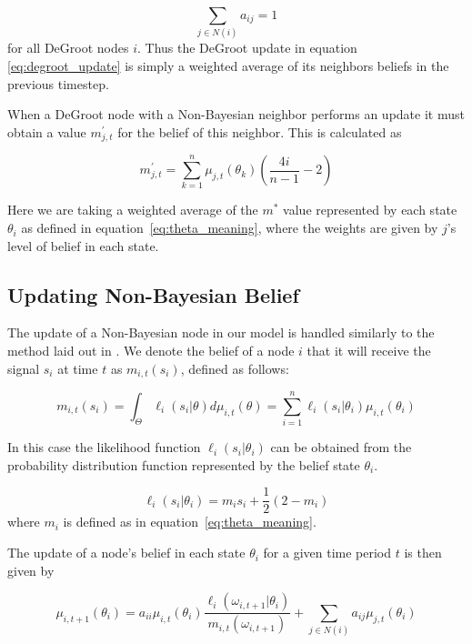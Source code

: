 \documentclass[a4paper,12pt]{article}
\begin{document}
\begin{equation}
\nonumber
\sum_{j \in N(i)} a_{ij} = 1
\end{equation}
for all DeGroot nodes $i$.  Thus the DeGroot update in equation \ref{eq:degroot_update} is simply a weighted average of its neighbors beliefs in the previous timestep.

When a DeGroot node with a Non-Bayesian neighbor performs an update it must obtain a value 
$m_{j,t}^\prime$ for the belief of this neighbor.  This is calculated as

\begin{equation}
m_{j,t}^\prime = \sum_{k=1}^n\mu_{j,t}(\theta_k)(\frac{4i}{n - 1} - 2)
\end{equation}

Here we are taking a weighted average of the $m^*$ value represented by each state $\theta_i$ as defined in equation~\ref{eq:theta_meaning}, where the weights are given by $j$'s level of belief in each state.

\subsection{Updating Non-Bayesian Belief}

The update of a Non-Bayesian node in our model is handled similarly to the method laid out 
in \cite{Jadbabaie2012}.  We denote the belief of a node $i$ that it will receive the signal $s_i$ at time $t$ as $m_{i,t}(s_i)$, defined as follows:

\begin{equation}
m_{i,t}(s_i) = \int_\Theta \ell_i(s_i|\theta)d\mu_{i,t}(\theta) = \sum_{i=1}^n \ell_i(s_i|\theta_i)\mu_{i,t}(\theta_i)
\end{equation}

In this case the likelihood function $\ell_i(s_i|\theta_i)$ can be obtained from the probability distribution function represented by the belief state $\theta_i$.

\begin{equation}
\label{eq:likelihood}
\ell_i(s_i|\theta_i) = m_i s_i + \frac{1}{2}(2 - m_i)
\end{equation}
where $m_i$ is defined as in equation~\ref{eq:theta_meaning}.

The update of a node's belief in each state $\theta_i$ for a given time period $t$ is then given by

\begin{equation}
\mu_{i,t+1}(\theta_i) = a_{ii}\mu_{i,t}(\theta_i)\frac{\ell_i(\omega_{i,t+1}|\theta_i)}{m_{i,t}(\omega_{i,t+1})} + \sum_{j \in N(i)} a_{ij}\mu_{j,t}(\theta_i)
\end{equation}
\end{document}
